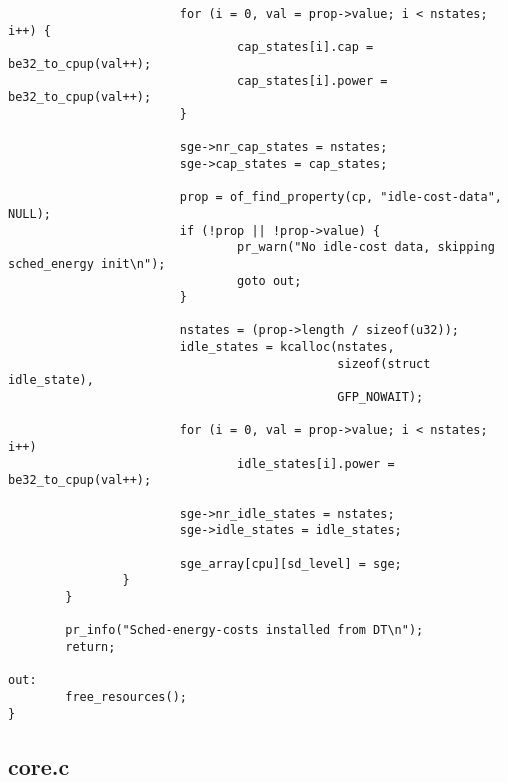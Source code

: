 \documentclass{article}
\begin{document}
\begin{verbatim}
                        for (i = 0, val = prop->value; i < nstates; i++) {
                                cap_states[i].cap = be32_to_cpup(val++);
                                cap_states[i].power = be32_to_cpup(val++);
                        }

                        sge->nr_cap_states = nstates;
                        sge->cap_states = cap_states;

                        prop = of_find_property(cp, "idle-cost-data", NULL);
                        if (!prop || !prop->value) {
                                pr_warn("No idle-cost data, skipping sched_energy init\n");
                                goto out;
                        }

                        nstates = (prop->length / sizeof(u32));
                        idle_states = kcalloc(nstates,
                                              sizeof(struct idle_state),
                                              GFP_NOWAIT);

                        for (i = 0, val = prop->value; i < nstates; i++)
                                idle_states[i].power = be32_to_cpup(val++);

                        sge->nr_idle_states = nstates;
                        sge->idle_states = idle_states;

                        sge_array[cpu][sd_level] = sge;
                }
        }

        pr_info("Sched-energy-costs installed from DT\n");
        return;

out:
        free_resources();
}
\end{verbatim}


\subsection{core.c}
\end{document}
